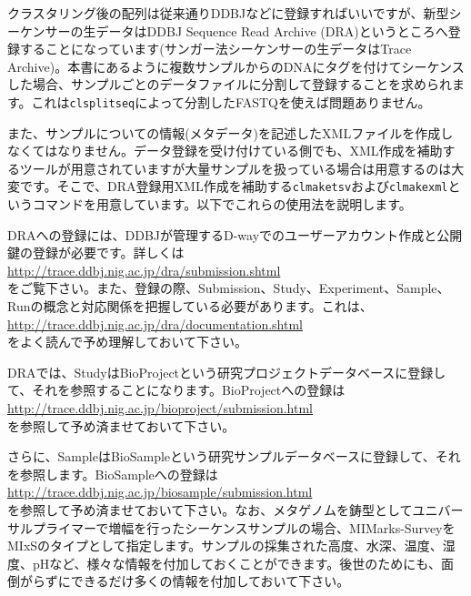 \documentclass[titlepage,10pt,a4paper,english]{jsbook}
\begin{document}
クラスタリング後の配列は従来通りDDBJなどに登録すればいいですが、新型シーケンサーの生データはDDBJ Sequence Read Archive (DRA)というところへ登録することになっています(サンガー法シーケンサーの生データはTrace Archive)。本書にあるように複数サンプルからのDNAにタグを付けてシーケンスした場合、サンプルごとのデータファイルに分割して登録することを求められます。これは\texttt{clsplitseq}によって分割したFASTQを使えば問題ありません。

また、サンプルについての情報(メタデータ)を記述したXMLファイルを作成しなくてはなりません。データ登録を受け付けている側でも、XML作成を補助するツールが用意されていますが大量サンプルを扱っている場合は用意するのは大変です。そこで、DRA登録用XML作成を補助する\texttt{clmaketsv}および\texttt{clmakexml}というコマンドを用意しています。以下でこれらの使用法を説明します。

DRAへの登録には、DDBJが管理するD-wayでのユーザーアカウント作成と公開鍵の登録が必要です。詳しくは\\
\href{http://trace.ddbj.nig.ac.jp/dra/submission.shtml}{http://trace.ddbj.nig.ac.jp/dra/submission.shtml}\\
をご覧下さい。また、登録の際、Submission、Study、Experiment、Sample、Runの概念と対応関係を把握している必要があります。これは、\\
\href{http://trace.ddbj.nig.ac.jp/dra/documentation.shtml}{http://trace.ddbj.nig.ac.jp/dra/documentation.shtml}\\
をよく読んで予め理解しておいて下さい。

DRAでは、StudyはBioProjectという研究プロジェクトデータベースに登録して、それを参照することになります。BioProjectへの登録は\\
\href{http://trace.ddbj.nig.ac.jp/bioproject/submission.html}{http://trace.ddbj.nig.ac.jp/bioproject/submission.html}\\
を参照して予め済ませておいて下さい。

さらに、SampleはBioSampleという研究サンプルデータベースに登録して、それを参照します。BioSampleへの登録は\\
\href{http://trace.ddbj.nig.ac.jp/biosample/submission.html}{http://trace.ddbj.nig.ac.jp/biosample/submission.html}\\
を参照して予め済ませておいて下さい。なお、メタゲノムを鋳型としてユニバーサルプライマーで増幅を行ったシーケンスサンプルの場合、MIMarks-SurveyをMIxSのタイプとして指定します。サンプルの採集された高度、水深、温度、湿度、pHなど、様々な情報を付加しておくことができます。後世のためにも、面倒がらずにできるだけ多くの情報を付加しておいて下さい。
\end{document}

